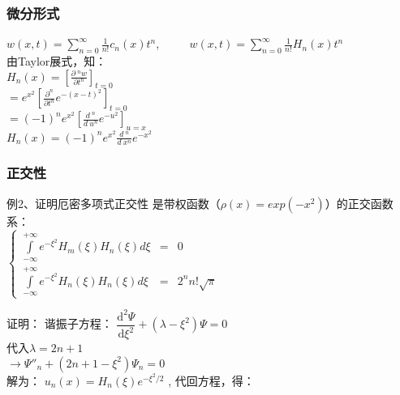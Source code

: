 \begin{frame}
	\frametitle{ 微分形式 }
	$ \displaystyle w(x,t) =\sum_{n=0}^{\infty} \frac{1}{n!}  c_n(x) t^n $, ~~~~
	{ $ \displaystyle w(x,t) =\sum_{n=0}^{\infty} \frac{1}{n!}  H_n(x) t^n  $} \\
	由Taylor展式，知：\\
	{ $ \displaystyle  H_n(x) = \left[  \frac{\partial ~^n w  }{\partial t^n}  \right] _{t=0} $}\\ 
	\hspace{1cm} {$ 	\displaystyle  =e^{x^2}   \left[  \frac{\partial ^n }{\partial t^n}  e^{-(x-t)^2}   \right] _{t=0}   $}  \\ 
	\hspace{1cm} {$ 	\displaystyle  =(-1) ^n e^{x^2}   \left[  \frac{d~^n }{d~u^n}  e^{-u^2}   \right] _{u=x}   $}  \\ 
	{$ 	\displaystyle H_n(x) =(-1) ^n e^{x^2}  \frac{d~^n }{d~x^n}  e^{-x^2}   $}  \\ 
\end{frame}

\begin{frame}
	\frametitle{ 正交性 }
	\begin{exampleblock} { 例2、证明厄密多项式正交性 }
	是带权函数（$\rho(x) =exp(-x^2)$）的正交函数系：\\
	{$ \displaystyle  
	\left\{  
	\begin{array}{ccccc}
		\int\limits_{-\infty}^{+\infty} e^{-\xi^{2}} H_m(\xi) H_n(\xi)d\xi &=&0 ~~~~~~\\
		\int\limits_{-\infty}^{+\infty} e^{-\xi^{2}} H_n(\xi) H_n(\xi)d\xi &=&2^n n! \sqrt{\pi}  
	\end{array}
	\right.  
	$} 
	\end{exampleblock}
\alert {证明：}	
	谐振子方程：{ $ \displaystyle \dfrac{\mathrm{d} ^2\Psi}{\mathrm{d} \xi^2} + \left( \lambda - \xi^2 \right) \Psi=0  $  }  \\
	代入$\lambda=2n+1 $~\\
	$\to   \Psi''_n +(2n+1-\xi^2) \Psi_n =0$ \\
	解为： $u_n(x)=H_n(\xi) e^{-\xi^{2}/2}$ , 代回方程，得：
\end{frame}

